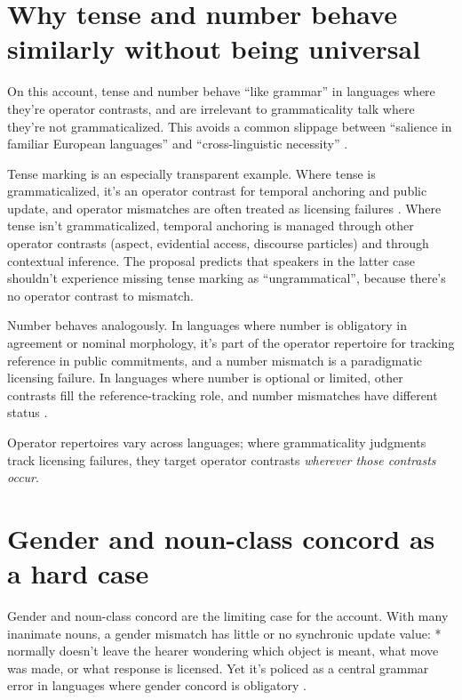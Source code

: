 \documentclass[12pt,letterpaper]{article}
\begin{document}
\section{Why tense and number behave similarly without being universal}

On this account, tense and number behave \enquote{like grammar} in languages where they're operator contrasts, and are irrelevant to grammaticality talk where they're not grammaticalized. This avoids a common slippage between \enquote{salience in familiar European languages} and \enquote{cross-linguistic necessity} \citep{haspelmath2007}.

Tense marking is an especially transparent example. Where tense is grammaticalized, it's an operator contrast for temporal anchoring and public update, and operator mismatches are often treated as licensing failures \citep{comrie1985}. Where tense isn't grammaticalized, temporal anchoring is managed through other operator contrasts (aspect, evidential access, discourse particles) and through contextual inference. The proposal predicts that speakers in the latter case shouldn't experience missing tense marking as \enquote{ungrammatical}, because there's no operator contrast to mismatch.

Number behaves analogously. In languages where number is obligatory in agreement or nominal morphology, it's part of the operator repertoire for tracking reference in public commitments, and a number mismatch is a paradigmatic licensing failure. In languages where number is optional or limited, other contrasts fill the reference-tracking role, and number mismatches have different status \citep{corbett2000}.

Operator repertoires vary across languages; where grammaticality judgments track licensing failures, they target operator contrasts \emph{wherever those contrasts occur}.

\section{Gender and noun-class concord as a hard case}

Gender and noun-class concord are the limiting case for the account. With many inanimate nouns, a gender mismatch has little or no synchronic update value: * normally doesn't leave the hearer wondering which object is meant, what move was made, or what response is licensed. Yet it's policed as a central grammar error in languages where gender concord is obligatory \citep{corbett1991}.
\end{document}
